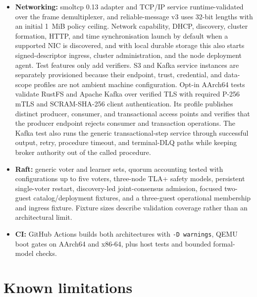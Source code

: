 \begin{itemize}
    \item \textbf{Networking:} smoltcp 0.13 adapter and TCP/IP service
        runtime-validated over the frame demultiplexer, and reliable-message v3
        uses 32-bit lengths with an initial 1~MiB policy ceiling. Network capability, DHCP, discovery, cluster
        formation, HTTP, and time synchronisation launch by default when a
        supported NIC is discovered, and with local durable storage this also
        starts signed-descriptor ingress, cluster administration, and the node
        deployment agent. Test features only add verifiers. S3 and
        Kafka service instances are separately provisioned because their
        endpoint, trust, credential, and data-scope profiles are not ambient
        machine configuration. Opt-in AArch64 tests validate RustFS and Apache
        Kafka over verified TLS with required P-256 mTLS and SCRAM-SHA-256
        client authentication. Its profile publishes distinct producer,
        consumer, and transactional access points and verifies that the
        producer endpoint rejects consumer and transaction operations. The
        Kafka test also runs the generic
        transactional-step service through successful output, retry, procedure
        timeout, and terminal-DLQ paths while keeping broker authority out of
        the called procedure.

    \item \textbf{Raft:} generic voter and learner sets, quorum accounting
        tested with configurations up to five voters, three-node TLA+ safety
        models, persistent single-voter restart, discovery-led joint-consensus
        admission, focused two-guest catalog/deployment fixtures, and a
        three-guest operational membership and ingress fixture. Fixture sizes
        describe validation coverage rather than an architectural limit.

    \item \textbf{CI:} GitHub Actions builds both architectures with
        \texttt{-D warnings}, QEMU boot gates on AArch64 and x86-64, plus
        host tests and bounded formal-model checks.
\end{itemize}

\section{Known limitations}

